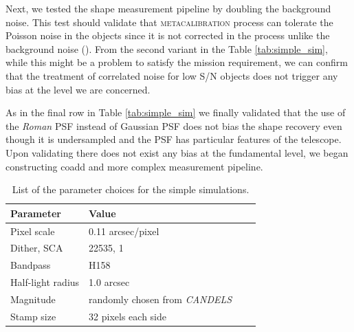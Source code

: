 \documentclass[fleqn,usenatbib]{mnras}
\begin{document}
Next, we tested the shape measurement pipeline by doubling the background noise. This test should validate that \textsc{metacalibration} process can tolerate the Poisson noise in the objects since it is not corrected in the process unlike the background noise (\citealt{2017ApJ...841...24S}). From the second variant in the Table \ref{tab:simple_sim}, while this might be a problem to satisfy the mission requirement, we can confirm that the treatment of correlated noise for low S/N objects does not trigger any bias at the level we are concerned. 

As in the final row in Table \ref{tab:simple_sim} we finally validated that the use of the \emph{Roman} PSF instead of Gaussian PSF does not bias the shape recovery even though it is undersampled and the PSF has particular features of the telescope. Upon validating there does not exist any bias at the fundamental level, we began constructing coadd and more complex measurement pipeline. 
\begin{table}
    \centering
    \begin{tabular}[width=\columnwidth]{|p{3cm}||p{3cm}|p{3cm}|p{3cm}|}
    \hline
    Parameter & Value \\
    \hline
    Pixel scale & 0.11 arcsec/pixel\\
    Dither, SCA & 22535, 1 \\ 
    Bandpass & H158 \\
    Half-light radius & 1.0 arcsec\\
    Magnitude & randomly chosen from \emph{CANDELS} \\ 
    Stamp size & 32 pixels each side\\
    \hline
    \end{tabular}
    \caption{List of the parameter choices for the simple simulations.}
    \label{tab:params}
\end{table}
\end{document}
